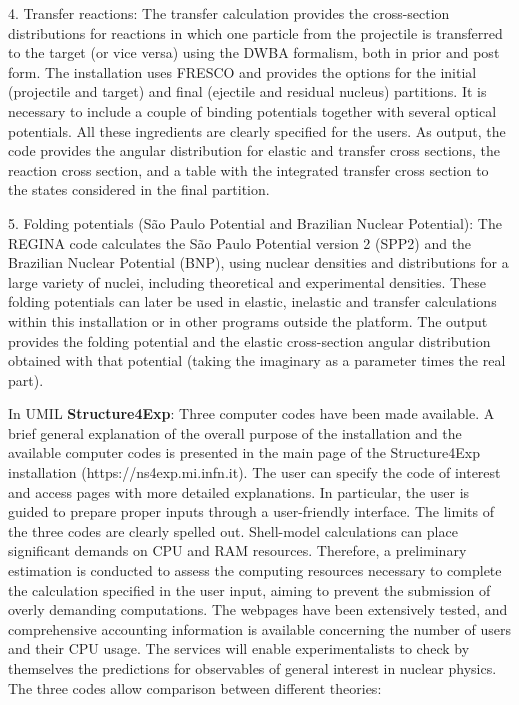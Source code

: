 4. Transfer reactions:
The transfer calculation provides the cross-section distributions for reactions in which one particle from the projectile is transferred to the target (or vice versa) using the DWBA formalism, both in prior and post form. The installation uses FRESCO and provides the options for the initial (projectile and target) and final (ejectile and residual nucleus) partitions. It is necessary to include a couple of binding potentials together with several optical potentials. All these ingredients are clearly specified for the users. As output, the code provides the angular distribution for elastic and transfer cross sections, the reaction cross section, and a table with the integrated transfer cross section to the states considered in the final partition.

5. Folding potentials (São Paulo Potential and Brazilian Nuclear Potential):
The REGINA code calculates the São Paulo Potential version 2 (SPP2) and the Brazilian Nuclear Potential (BNP), using nuclear densities and distributions for a large variety of nuclei, including theoretical and experimental densities. These folding potentials can later be used in elastic, inelastic and transfer calculations within this installation or in other programs outside the platform. The output provides the folding potential and the elastic cross-section angular distribution obtained with that potential (taking the imaginary as a parameter times the real part).


In UMIL \textbf{Structure4Exp}: Three computer codes have been made available. A brief general explanation of the overall purpose of the installation and the available computer codes is presented in the main page of the Structure4Exp installation (https://ns4exp.mi.infn.it). The user can specify the code of interest and access pages with more detailed explanations. In particular, the user is guided to prepare proper inputs through a user-friendly interface. The limits of the three codes are clearly spelled out. Shell-model calculations can place significant demands on CPU and RAM resources. Therefore, a preliminary estimation is conducted to assess the computing resources necessary to complete the calculation specified in the user input, aiming to prevent the submission of overly demanding computations. The webpages have been extensively tested, and comprehensive accounting information is available concerning the number of users and their CPU usage.
The services will enable experimentalists to check by themselves the predictions for observables of general interest in nuclear physics. The three codes allow comparison between different theories:



